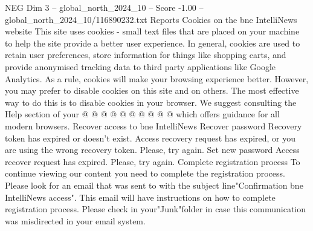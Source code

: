\begin{textsample}{NEG Dim 3 – global\_north\_2024\_10 – Score -1.00 – global\_north\_2024\_10/116890232.txt}
Reports Cookies on the bne IntelliNews website This site uses cookies - small text files that are placed on your machine to help the site provide a better user experience.
In general, cookies are used to retain user preferences, store information for things like shopping carts, and provide anonymised tracking data to third party applications like Google Analytics.
As a rule, cookies will make your browsing experience better.
However, you may prefer to disable cookies on this site and on others.
The most effective way to do this is to disable cookies in your browser.
We suggest consulting the Help section of your @ @ @ @ @ @ @ @ @ @ which offers guidance for all modern browsers.
Recover access to bne IntelliNews Recover password Recovery token has expired or doesn't exist.
Access recovery request has expired, or you are using the wrong recovery token.
Please, try again.
Set new password Access recover request has expired.
Please, try again.
Complete registration process To continue viewing our content you need to complete the registration process.
Please look for an email that was sent to with the subject line"Confirmation bne IntelliNews access".
This email will have instructions on how to complete registration process.
Please check in your"Junk"folder in case this communication was misdirected in your email system.

\end{textsample}
